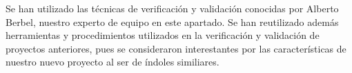 Se han utilizado las técnicas de verificación y validación conocidas por Alberto Berbel, nuestro experto de equipo en este apartado. Se han reutilizado además herramientas y procedimientos utilizados en la verificación y validación de proyectos anteriores, pues se consideraron interestantes por las características de nuestro nuevo proyecto al ser de índoles similiares.